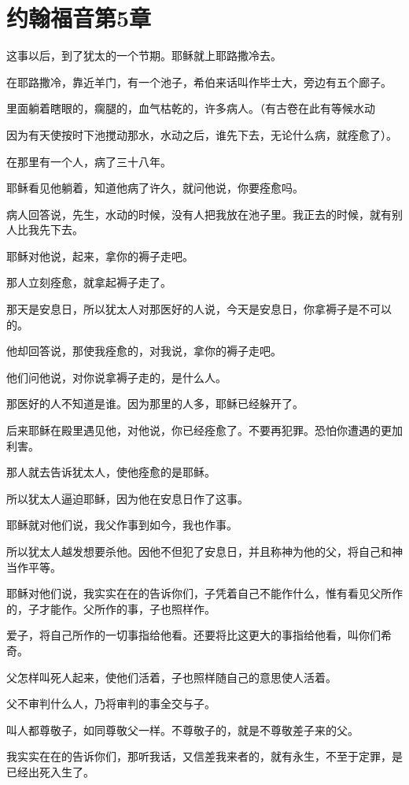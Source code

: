 \documentclass[12pt,oneside]{book}
\begin{document}
\chapter{约翰福音第5章}
这事以后，到了犹太的一个节期。耶稣就上耶路撒冷去。

在耶路撒冷，靠近羊门，有一个池子，希伯来话叫作毕士大，旁边有五个廊子。

里面躺着瞎眼的，瘸腿的，血气枯乾的，许多病人。（有古卷在此有等候水动

因为有天使按时下池搅动那水，水动之后，谁先下去，无论什么病，就痊愈了）。

在那里有一个人，病了三十八年。

耶稣看见他躺着，知道他病了许久，就问他说，你要痊愈吗。

病人回答说，先生，水动的时候，没有人把我放在池子里。我正去的时候，就有别人比我先下去。

耶稣对他说，起来，拿你的褥子走吧。

那人立刻痊愈，就拿起褥子走了。

那天是安息日，所以犹太人对那医好的人说，今天是安息日，你拿褥子是不可以的。

他却回答说，那使我痊愈的，对我说，拿你的褥子走吧。

他们问他说，对你说拿褥子走的，是什么人。

那医好的人不知道是谁。因为那里的人多，耶稣已经躲开了。

后来耶稣在殿里遇见他，对他说，你已经痊愈了。不要再犯罪。恐怕你遭遇的更加利害。

那人就去告诉犹太人，使他痊愈的是耶稣。

所以犹太人逼迫耶稣，因为他在安息日作了这事。

耶稣就对他们说，我父作事到如今，我也作事。

所以犹太人越发想要杀他。因他不但犯了安息日，并且称神为他的父，将自己和神当作平等。

耶稣对他们说，我实实在在的告诉你们，子凭着自己不能作什么，惟有看见父所作的，子才能作。父所作的事，子也照样作。

爱子，将自己所作的一切事指给他看。还要将比这更大的事指给他看，叫你们希奇。

父怎样叫死人起来，使他们活着，子也照样随自己的意思使人活着。

父不审判什么人，乃将审判的事全交与子。

叫人都尊敬子，如同尊敬父一样。不尊敬子的，就是不尊敬差子来的父。

我实实在在的告诉你们，那听我话，又信差我来者的，就有永生，不至于定罪，是已经出死入生了。
\end{document}
